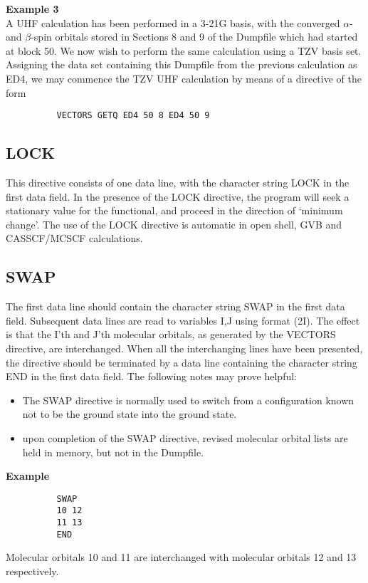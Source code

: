 \documentclass[11pt,fleqn]{article}
\begin{document}
{\bf Example 3}\\

A UHF calculation has been performed in a 3-21G
basis, with the converged $\alpha$- and $\beta$-spin orbitals stored
in Sections 8 and 9 of the Dumpfile which had started
at block 50. We now wish to perform the same
calculation using a TZV basis set. Assigning the data set
containing this Dumpfile from the previous calculation
as ED4, we may commence the TZV UHF calculation by means of a
directive of the form

{
\footnotesize
\begin{verbatim}
          VECTORS GETQ ED4 50 8 ED4 50 9
\end{verbatim}
}

\subsection[LOCK]{LOCK}

This directive consists of one data line, with the character string
LOCK in the first data field. In the presence of the LOCK directive,
the program will seek a stationary value for the functional, and
proceed in the direction of `minimum change'. The use of the LOCK
directive is automatic in open shell, GVB and CASSCF/MCSCF
calculations.

\subsection[SWAP]{SWAP}

The first data line should contain the character string SWAP in the
first data field. Subsequent data lines are read to variables I,J using
format (2I).
The effect is that the I'th and J'th molecular orbitals, as generated
by the VECTORS directive, are interchanged. When all the interchanging
lines have been presented, the directive should be terminated by a data
line containing the character string END in the first data field.
The following notes may prove helpful:

\begin{itemize}
\item The SWAP directive is normally used to switch from a configuration
known not to be the ground state into the ground state.
\item upon completion of the SWAP directive, revised molecular orbital
lists are held in memory, but not in the Dumpfile.
\end{itemize}

{\bf Example}
{
\footnotesize
\begin{verbatim}
          SWAP
          10 12
          11 13
          END
\end{verbatim}
}
Molecular orbitals 10 and 11 are interchanged with molecular orbitals
12 and 13 respectively.
\end{document}

